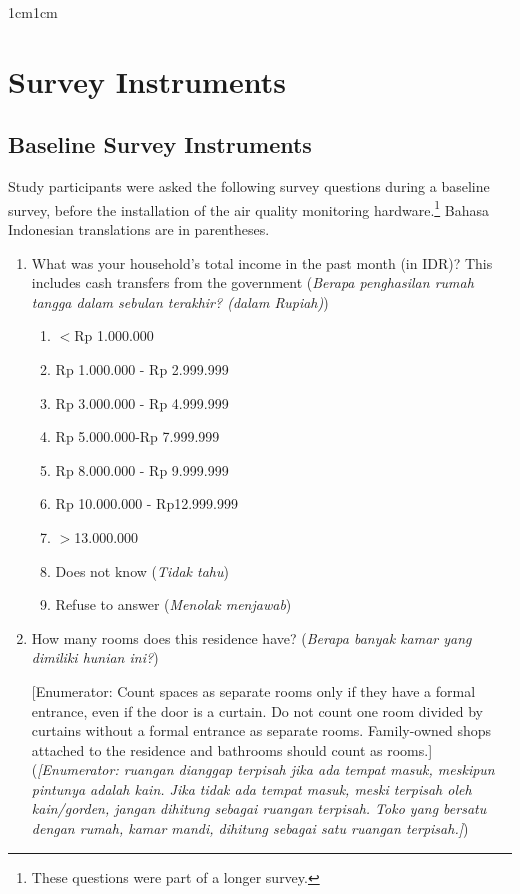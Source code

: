 \documentclass[9pt,twoside]{pnas-new}
\begin{document}
\SItext
\begin{adjustwidth}{1cm}{1cm} 
\section*{Survey Instruments}

\subsection*{Baseline Survey Instruments}

Study participants were asked the following survey questions during a baseline survey, before the installation of the air quality monitoring hardware.\footnote{These questions were part of a longer survey.} Bahasa Indonesian translations are in parentheses.

\begin{enumerate}
\item What was your household's total income in the past month (in IDR)? This includes cash transfers from the government (\textit{Berapa penghasilan rumah tangga dalam sebulan terakhir? (dalam Rupiah)})
\begin{enumerate}
    \item $<$Rp 1.000.000
    \item Rp 1.000.000 - Rp 2.999.999
    \item Rp 3.000.000 - Rp 4.999.999
    \item Rp 5.000.000-Rp 7.999.999
    \item Rp 8.000.000 - Rp 9.999.999
    \item Rp 10.000.000 - Rp12.999.999
    \item $>$13.000.000
        \item Does not know (\textit{Tidak tahu})
        \item Refuse to answer (\textit{Menolak menjawab})
\end{enumerate}
\item How many rooms does this residence have? (\textit{Berapa banyak kamar yang dimiliki hunian ini?})

[Enumerator: Count spaces as separate rooms only if they have a formal entrance, even if the door is a curtain. Do not count one room divided by curtains without a formal entrance as separate rooms. Family-owned shops attached to the residence and bathrooms should count as rooms.] \\ 
(\textit{[Enumerator: ruangan dianggap terpisah jika ada tempat masuk, meskipun pintunya adalah kain. Jika tidak ada tempat masuk, meski terpisah oleh kain/gorden, jangan dihitung sebagai ruangan terpisah. Toko yang bersatu dengan rumah, kamar mandi, dihitung sebagai satu ruangan terpisah.]})


\end{enumerate}
\end{adjustwidth}
\end{document}
